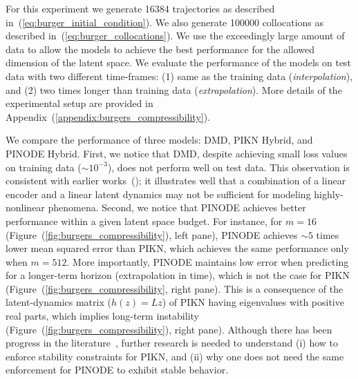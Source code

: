 For this experiment we generate 16384 trajectories as described in~(\ref{eq:burger_initial_condition}). We also generate 100000 collocations as described in~(\ref{eq:burger_collocations}). We use the exceedingly large amount of data to allow the models to achieve the best performance for the allowed dimension of the latent space. We evaluate the performance of the models on test data with two different time-frames: (1) same as the training data (\textit{interpolation}), and (2) two times longer than training data (\textit{extrapolation}). More details of the experimental setup are provided in Appendix~(\ref{appendix:burgers_compressibility}).

We compare the performance of three models: DMD, PIKN Hybrid, and PINODE Hybrid. First, we notice that DMD, despite achieving small loss values on training data ($\sim 10^{-3}$), does not perform well on test data. This observation is consistent with earlier works~(\cite{kalur2021robust,kutz2016dynamic}); it illustrates well that a combination of a linear encoder and a linear latent dynamics may not be sufficient for modeling highly-nonlinear phenomena. Second, we notice that PINODE achieves better performance within a given latent space budget. For instance, for $m = 16$ (Figure~(\ref{fig:burgers_compressibility}), left pane), PINODE achieves $\sim 5$ times lower mean squared error than PIKN, which achieves the same performance only when $m = 512$. More importantly, PINODE maintains low error when predicting for a longer-term horizon (extrapolation in time), which is not the case for PIKN (Figure~(\ref{fig:burgers_compressibility}, right pane). This is a consequence of the latent-dynamics matrix ($h(z) = Lz$) of PIKN having eigenvalues with positive real parts, which implies long-term instability (Figure~(\ref{fig:burgers_compressibility}), right pane). Although there has been progress in the literature~\cite{kojimalearning}, further research is needed to understand (i) how to enforce stability constraints for PIKN, and (ii) why one does not need the same enforcement for PINODE to exhibit stable behavior. 

